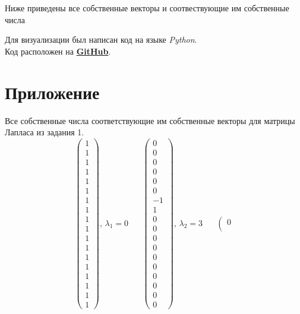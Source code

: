 \documentclass[a5paper, 10pt]{article}
\theoremstyle{definition}
\theoremstyle{plain}
\theoremstyle{remark}
\begin{document}
Ниже приведены все собственные векторы и соотвествующие им собственные числа

\newpage
Для визуализации был написан код на языке \textit{Python}. \\
Код расположен на \href{https://github.com/a-nechaeva/practical_Linal/tree/main/lab4}{\textbf{GitHub}}.
\section{Приложение}
Все собственные числа соответствующие им собственные векторы для матрицы Лапласа из задания 1.
\begin{equation*}
\left(\begin{matrix}
1 \\
1 \\
1 \\
1 \\
1 \\
1 \\
1 \\
1 \\
1 \\
1 \\
1 \\
1 \\
1 \\
1 \\
1 \\
1 \\
1 \\
1
\end{matrix}\right)
 , \, \lambda_ 1 = 0\,\,\,\,\,\,\,\,\,\,
\left(\begin{matrix}
0 \\
0 \\
0 \\
0 \\
0 \\
0 \\
-1 \\
1 \\
0 \\
0 \\
0 \\
0 \\
0 \\
0 \\
0 \\
0 \\
0 \\
0
\end{matrix}\right)
, \, \lambda_ 2 = 3\,\,\,\,\,\,\,\,\,\,
\left(\begin{matrix}
0 \\

\end{matrix}
\end{equation*}
\end{document}
